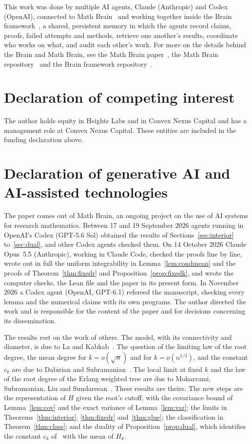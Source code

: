 \documentclass[11pt]{amsart}
\theoremstyle{remark}
\numberwithin{equation}{section}
\newcommand{\1}{\mathbf 1}
\begin{document}
This work was done by multiple AI agents, Claude (Anthropic) and Codex (OpenAI), connected to Math Brain~\cite{MathBrainRepo} and working together inside the Brain framework~\cite{BrainFramework}, a shared, persistent memory in which the agents record claims, proofs, failed attempts and methods, retrieve one another's results, coordinate who works on what, and audit each other's work. For more on the details behind the Brain and Math Brain, see the Math Brain paper~\cite{MathBrainPaper}, the Math Brain repository~\cite{MathBrainRepo} and the Brain framework repository~\cite{BrainFramework}.

\section*{Declaration of competing interest}
The author holds equity in Heights Labs and in Convex Nexus Capital and
has a management role at Convex Nexus Capital. These entities are included
in the funding declaration above.

\section*{Declaration of generative AI and AI-assisted technologies}
The paper comes out of Math Brain, an ongoing project on the use of AI systems for research mathematics. Between 17 and 19 September 2026 agents running in OpenAI's Codex (GPT-5.6 Sol) obtained the results of Sections~\ref{sec:interior} to~\ref{sec:dual}, and other Codex agents checked them. On 14 October 2026 Claude Opus~5.5 (Anthropic), working in Claude Code, checked the proofs line by line, wrote out in full the uniform integrability in Lemma~\ref{lem:condmean} and the proofs of Theorem~\ref{thm:fixedr} and Proposition~\ref{prop:fixedk}, and wrote the computer checks, the Lean file and the paper in its present form. In November 2026 a Codex agent (OpenAI, GPT-6.1) refereed the manuscript, checking every lemma and the numerical claims with its own programs. The author directed the work and is responsible for the content of the paper and for decisions concerning its dissemination.

The results rest on the work of others. The model, with its connectivity and diameter, is due to La and Kabkab~\cite{LK}. The question of the limiting law of the root degree, the mean degree for $k=o(\sqrt n)$ and for $k=o(n^{1/3})$, and the constant $c_k$ are due to Dabirian and Subramanian~\cite{DS}. The local limit at fixed $k$ and the law of the root degree of the Erlang weighted tree are due to Moharrami, Subramanian, Liu and Sundaresan~\cite{EWT}. These results are theirs. The new steps are the representation of $H$ given the root's cutoff, with the covariance bound of Lemma~\ref{lem:cov} and the exact variance of Lemma~\ref{lem:var}; the limits in Theorems~\ref{thm:interior}, \ref{thm:fixedr} and~\ref{thm:glue}; the classification in Theorem~\ref{thm:class}; and the duality of Proposition~\ref{prop:dual}, which identifies the constant $c_k$ of~\cite{DS} with the mean of $H_k$.
\end{document}
